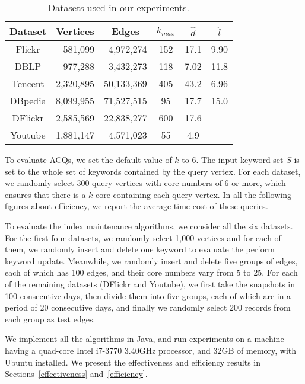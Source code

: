 \begin{table}[h]
  \centering
  \small
  \footnotesize \caption {Datasets used in our experiments.}\label{tab:dataset}
  \begin{tabular}{c|r|r|c|c|c}
     \hline
          {\bf Dataset}  & \multicolumn{1}{c|}{\textbf{Vertices}}
                         & \multicolumn{1}{c|}{\textbf{Edges}}
                         & $k_{max}$
                         & \textbf{\emph{{$\widehat d$}}}
                         & \textbf{\emph{{$\widehat l$}}}\\
     \hline\hline
          Flickr         &  581,099      &  4,972,274   &   152   & 17.1   &  9.90 \\
     \hline
          DBLP           &  977,288      &  3,432,273   &   118   &  7.02  &  11.8 \\
     \hline
          Tencent        &  2,320,895    &  50,133,369  &   405   &  43.2  &  6.96 \\
     \hline
          DBpedia        &  8,099,955    &  71,527,515  &    95   &  17.7  &  15.0 \\
     \hline
          DFlickr        &  2,585,569    &  22,838,277  &   600   &  17.6  &  --- \\
     \hline
          Youtube        &  1,881,147    &  4,571,023   &   55   &  4.9  &  --- \\
     \hline
  \end{tabular}
\end{table}

{\color{blue}
To evaluate ACQs, we set the default value of $k$ to 6. The input keyword set $S$ is set to the whole set of keywords contained by the query vertex. For each dataset, we randomly select 300 query vertices with core numbers of 6 or more, which ensures that there is a $k$-core containing each query vertex.
In all the following figures about efficiency, we report the average time cost of these queries.

To evaluate the index maintenance algorithms, we consider all the six datasets.
For the first four datasets, we randomly select 1,000 vertices and for each of them, we randomly insert and delete one keyword to evaluate the perform keyword update. Meanwhile, we randomly insert and delete five groups of edges, each of which has 100 edges, and their core numbers vary from 5 to 25.
For each of the remaining datasets (DFlickr and Youtube), we first take the snapshots in 100 consecutive days, then divide them into five groups, each of which are in a period of 20 consecutive days, and finally we randomly select 200 records from each group as test edges.
}

We implement all the algorithms in Java, and run experiments on a machine having a quad-core Intel i7-3770 3.40GHz processor, and 32GB of memory, with Ubuntu installed.
We present the effectiveness and efficiency results in Sections~\ref{effectiveness} and~\ref{efficiency}.
